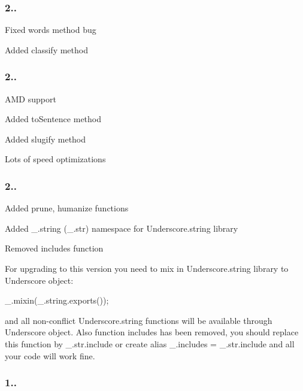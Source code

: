 \subsubsection*{2..}


\begin{DoxyItemize}
\item Fixed words method bug
\item Added classify method
\end{DoxyItemize}

\subsubsection*{2..}


\begin{DoxyItemize}
\item A\+MD support
\item Added to\+Sentence method
\item Added slugify method
\item Lots of speed optimizations
\end{DoxyItemize}

\subsubsection*{2..}


\begin{DoxyItemize}
\item Added prune, humanize functions
\item Added \+\_\+.\+string (\+\_\+.\+str) namespace for Underscore.\+string library
\item Removed includes function
\end{DoxyItemize}

For upgrading to this version you need to mix in Underscore.\+string library to Underscore object\+:


\begin{DoxyCode}
\_.mixin(\_.string.exports());
\end{DoxyCode}


and all non-\/conflict Underscore.\+string functions will be available through Underscore object. Also function {\ttfamily includes} has been removed, you should replace this function by {\ttfamily \+\_\+.\+str.\+include} or create alias {\ttfamily \+\_\+.\+includes = \+\_\+.\+str.\+include} and all your code will work fine.

\subsubsection*{1..}


